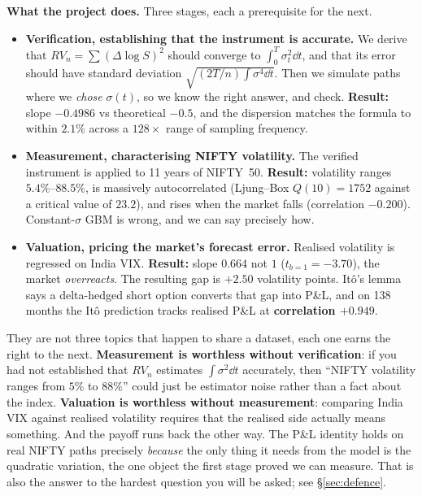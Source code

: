 \documentclass[11pt,a4paper]{article}
\begin{document}
\textbf{What the project does.} Three stages, each a prerequisite for the next.
\begin{itemize}[leftmargin=*,topsep=1pt,itemsep=2pt]
\item \textbf{Verification, establishing that the instrument is accurate.} We derive that
      $RV_n=\sum(\Delta\log S)^2$ should converge to $\int_0^T\sigma_t^2\dd t$, and that its
      error should have standard deviation $\sqrt{(2T/n)\int\sigma^4\dd t}$. Then we simulate
      paths where we \emph{chose} $\sigma(t)$, so we know the right answer, and check.
      \textbf{Result:} slope $-0.4986$ vs theoretical $-0.5$, and the dispersion matches the
      formula to within $2.1\%$ across a $128\times$ range of sampling frequency.
\item \textbf{Measurement, characterising NIFTY volatility.} The verified instrument is
      applied to 11 years of NIFTY~50. \textbf{Result:} volatility ranges $5.4\%$--$88.5\%$, is massively
      autocorrelated (Ljung--Box $Q(10)=1752$ against a critical value of $23.2$), and rises
      when the market falls (correlation $-0.200$). Constant-$\sigma$ GBM is wrong, and we can
      say precisely how.
\item \textbf{Valuation, pricing the market's forecast error.} Realised volatility is
      regressed on India VIX. \textbf{Result:} slope $0.664$ not $1$
      ($t_{b=1}=-3.70$), the market \emph{overreacts}. The resulting gap is $+2.50$
      volatility points. It\^o's lemma says a delta-hedged short option converts that gap into
      P\&L, and on 138 months the It\^o prediction tracks realised P\&L at
      \textbf{correlation $+0.949$}.
\end{itemize}

\begin{whybox}
They are not three topics that happen to share a dataset, each one earns the right to the
next. \textbf{Measurement is worthless without verification}: if you had not established that
$RV_n$ estimates $\int\sigma^2\dd t$ accurately, then ``NIFTY volatility ranges from $5\%$ to
$88\%$'' could just be estimator noise rather than a fact about the index.
\textbf{Valuation is worthless without measurement}: comparing India VIX against realised
volatility requires that the realised side actually means something.
\smallskip
And the payoff runs back the other way. The P\&L identity holds on real NIFTY paths precisely
\emph{because} the only thing it needs from the model is the quadratic variation, the one
object the first stage proved we can measure. That is also the answer to the hardest question
you will be asked; see \S\ref{sec:defence}.
\end{whybox}
\end{document}
